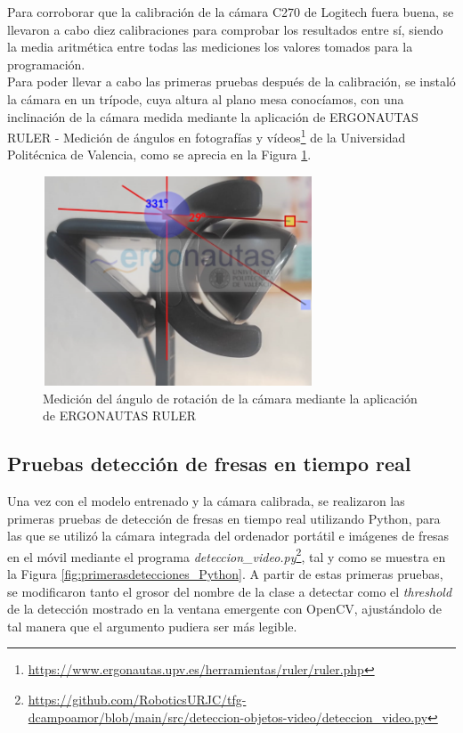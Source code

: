 Para corroborar que la calibración de la cámara C270 de Logitech fuera buena, se llevaron a cabo diez calibraciones para comprobar los resultados entre sí, siendo la media aritmética entre todas las mediciones los valores tomados para la programación.\\

Para poder llevar a cabo las primeras pruebas después de la calibración, se instaló la cámara en un trípode, cuya altura al plano mesa conocíamos, con una inclinación de la cámara medida mediante la aplicación de ERGONAUTAS RULER - Medición de ángulos en fotografías y vídeos\footnote{\url{https://www.ergonautas.upv.es/herramientas/ruler/ruler.php}} de la Universidad Politécnica de Valencia, como se aprecia en la Figura \ref{fig:medicion_angulo_ERGONAUTAS}.


 \begin{figure}[H]
     \centering
     \begin{center}
       \includegraphics[width=80mm]{figs/ERGONAUTAS Medicion angulo.png}
     \end{center}
     \caption{Medición del ángulo de rotación de la cámara mediante la aplicación de ERGONAUTAS RULER}
    \label{fig:medicion_angulo_ERGONAUTAS}
  \end{figure}


\subsection{Pruebas detección de fresas en tiempo real}
\label{sec:Pruebas_Fresas_Pytorch}

Una vez con el modelo entrenado y la cámara calibrada, se realizaron las primeras pruebas de detección de fresas en tiempo real utilizando Python, para las que se utilizó la cámara integrada del ordenador portátil e imágenes de fresas en el móvil mediante el programa \textit{deteccion\_video.py}\footnote{\url{https://github.com/RoboticsURJC/tfg-dcampoamor/blob/main/src/deteccion-objetos-video/deteccion_video.py}}, tal y como se muestra en la Figura \ref{fig:primerasdetecciones_Python}. A partir de estas primeras pruebas, se modificaron tanto el grosor del nombre de la clase a detectar como el \textit{threshold} de la detección mostrado en la ventana emergente con OpenCV, ajustándolo de tal manera que el argumento pudiera ser más legible.


